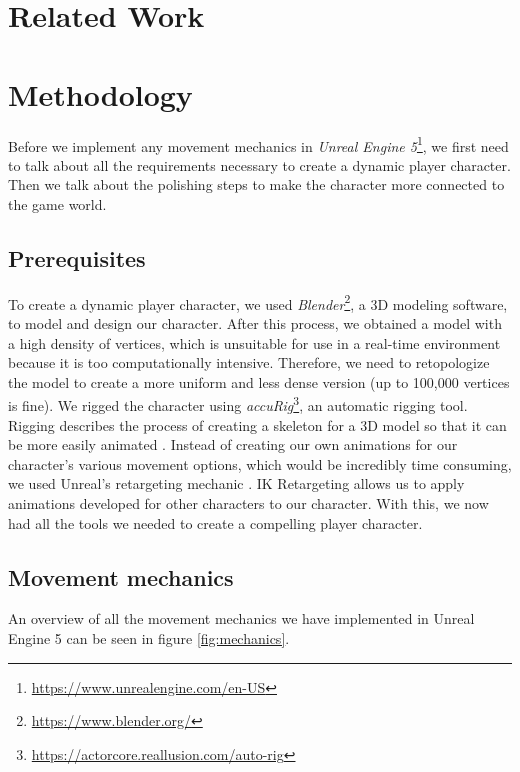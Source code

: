 \documentclass[conference]{IEEEtran}
\begin{document}
\section{Related Work}
\label{Sec:RelatedWork}

\section{Methodology}
\label{Sec:Methodology}

Before we implement any movement mechanics in \textit{Unreal Engine 5}\footnote{\url{https://www.unrealengine.com/en-US}}, we first need to talk about all the requirements necessary to create a dynamic player character.
Then we talk about the polishing steps to make the character more connected to the game world.

\subsection{Prerequisites}

To create a dynamic player character, we used \textit{Blender}\footnote{\url{https://www.blender.org/}}, a 3D modeling software, to model and design our character.
After this process, we obtained a model with a high density of vertices, which is unsuitable for use in a real-time environment because it is too computationally intensive.
Therefore, we need to retopologize the model to create a more uniform and less dense version (up to 100,000 vertices is fine).
We rigged the character using \textit{accuRig}\footnote{\url{https://actorcore.reallusion.com/auto-rig}}, an automatic rigging tool.
Rigging describes the process of creating a skeleton for a 3D model so that it can be more easily animated \cite{rigging}.
Instead of creating our own animations for our character's various movement options, which would be incredibly time consuming, we used Unreal's retargeting mechanic \cite{retarget}.
IK Retargeting allows us to apply animations developed for other characters to our character.
With this, we now had all the tools we needed to create a compelling player character.

\subsection{Movement mechanics}

An overview of all the movement mechanics we have implemented in Unreal Engine 5 can be seen in figure \ref{fig:mechanics}.
\end{document}
